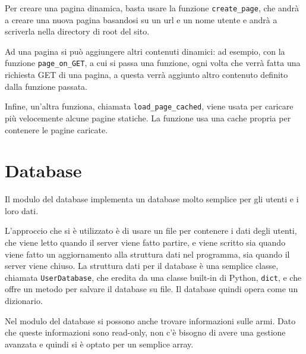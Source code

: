 \documentclass[a4paper,12pt]{report}
\begin{document}
Per creare una pagina dinamica, basta usare la funzione \texttt{create\_page}, che andrà a creare una nuova pagina basandosi su un url e un nome utente e andrà a scriverla nella directory di root del sito.

Ad una pagina si può aggiungere altri contenuti dinamici: ad esempio, con la funzione \texttt{page\_on\_GET}, a cui si passa una funzione, ogni volta che verrà fatta una richiesta GET di una pagina, a questa verrà aggiunto altro contenuto definito dalla funzione passata.

Infine, un'altra funziona, chiamata \texttt{load\_page\_cached}, viene usata per caricare più velocemente alcune pagine statiche. La funzione usa una cache propria per contenere le pagine caricate.

\section{Database}

Il modulo del database implementa un database molto semplice per gli utenti e i loro dati.

L'approccio che si è utilizzato è di usare un file per contenere i dati degli utenti, che viene letto quando il server viene fatto partire, e viene scritto sia quando viene fatto un aggiornamento alla struttura dati nel programma, sia quando il server viene chiuso. La struttura dati per il database è una semplice classe, chiamata \texttt{UserDatabase}, che eredita da una classe built-in di Python, \texttt{dict}, e che offre un metodo per salvare il database su file. Il database quindi opera come un dizionario.

Nel modulo del database si possono anche trovare informazioni sulle armi. Dato che queste informazioni sono read-only, non c'è bisogno di avere una gestione avanzata e quindi si è optato per un semplice array.
\end{document}
